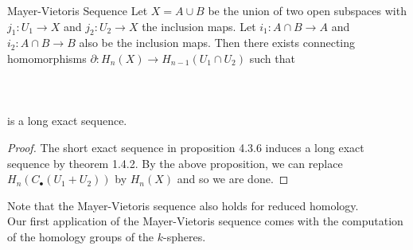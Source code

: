 \documentclass[a4paper]{article}
\begin{document}
\begin{thm}{Mayer-Vietoris Sequence}{} Let $X=A\cup B$ be the union of two open subspaces with $j_1:U_1\to X$ and $j_2:U_2\to X$ the inclusion maps. Let $i_1:A\cap B\to A$ and $i_2:A\cap B\to B$ also be the inclusion maps. Then there exists connecting homomorphisms $\partial:H_n(X)\to H_{n-1}(U_1\cap U_2)$ such that \\~\\
\\~\\
is a long exact sequence. \tcbline
\begin{proof}
The short exact sequence in proposition 4.3.6 induces a long exact sequence by theorem 1.4.2. By the above proposition, we can replace $H_n(C_\bullet(U_1+U_2))$ by $H_n(X)$ and so we are done. 
\end{proof}
\end{thm}

Note that the Mayer-Vietoris sequence also holds for reduced homology. \\

Our first application of the Mayer-Vietoris sequence comes with the computation of the homology groups of the $k$-spheres. 
\end{document}
